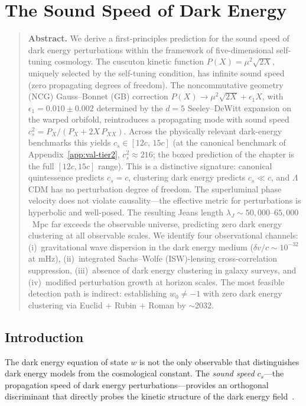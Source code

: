 \chapter{The Sound Speed of Dark Energy}
\label{ch:sound-speed}

\begin{quote}
\textbf{Abstract.}
We derive a first-principles prediction for the sound speed of dark energy perturbations within the framework of five-dimensional self-tuning cosmology. The cuscuton kinetic function $P(X) = \mu^2 \sqrt{2X}$, uniquely selected by the self-tuning condition, has infinite sound speed (zero propagating degrees of freedom). The noncommutative geometry (NCG) Gauss--Bonnet (GB) correction $P(X) \to \mu^2 \sqrt{2X} + \epsilon_1 X$, with $\epsilon_1 = 0.010 \pm 0.002$ determined by the $d = 5$ Seeley--DeWitt expansion on the warped orbifold, reintroduces a propagating mode with sound speed $c_s^2 = P_X/(P_X + 2X\,P_{XX})$. Across the physically relevant dark-energy benchmarks this yields $c_s \in [12c,\, 15c]$ (at the canonical benchmark of Appendix~\ref{app:val-tier2}, $c_s^2 \approx 216$; the boxed prediction of the chapter is the full $[12c, 15c]$ range). This is a distinctive signature: canonical quintessence predicts $c_s = c$, clustering dark energy predicts $c_s \ll c$, and $\Lambda$CDM has no perturbation degree of freedom. The superluminal phase velocity does not violate causality---the effective metric for perturbations is hyperbolic and well-posed. The resulting Jeans length $\lambda_J \sim 50{,}000$--$65{,}000$~Mpc far exceeds the observable universe, predicting zero dark energy clustering at all observable scales. We identify four observational channels: (i)~gravitational wave dispersion in the dark energy medium ($\delta v/c \sim 10^{-32}$ at mHz), (ii)~integrated Sachs--Wolfe (ISW)-lensing cross-correlation suppression, (iii)~absence of dark energy clustering in galaxy surveys, and (iv)~modified perturbation growth at horizon scales. The most feasible detection path is indirect: establishing $w_0 \neq -1$ with zero dark energy clustering via Euclid + Rubin + Roman by ${\sim}2032$.
\end{quote}

\section{Introduction}
\label{sec:5-introduction}

The dark energy equation of state $w$ is not the only observable that distinguishes dark energy models from the cosmological constant. The \emph{sound speed} $c_s$---the propagation speed of dark energy perturbations---provides an orthogonal discriminant that directly probes the kinetic structure of the dark energy field~\cite{ch5:BeanDore2004,ch5:Hu2005}.

